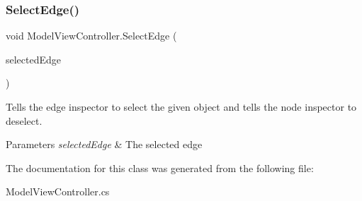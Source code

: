 \subsubsection{\texorpdfstring{Select\+Edge()}{SelectEdge()}}
{\footnotesize\ttfamily void Model\+View\+Controller.\+Select\+Edge (\begin{DoxyParamCaption}\item[{Game\+Object}]{selected\+Edge }\end{DoxyParamCaption})}



Tells the edge inspector to select the given object and tells the node inspector to deselect. 


\begin{DoxyParams}{Parameters}
{\em selected\+Edge} & The selected edge\\
\hline
\end{DoxyParams}


The documentation for this class was generated from the following file\+:\begin{DoxyCompactItemize}
\item 
Model\+View\+Controller.\+cs\end{DoxyCompactItemize}
